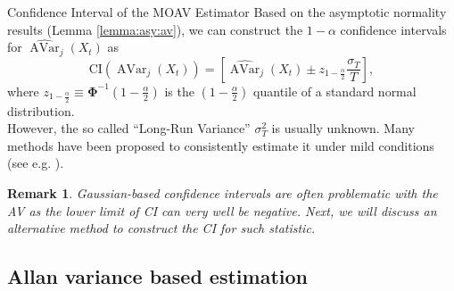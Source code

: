 \documentclass[envcountsect,usenames,dvipsnames]{beamer}
\DeclareMathOperator{\AV}{AVar}
\theoremstyle{mystyle}
\newtheorem{Remark}{Remark}
\begin{document}
\begin{frame}{Confidence Interval of the MOAV Estimator}
Based on the asymptotic normality results (Lemma \ref{lemma:asy:av}), we can construct the $1-\alpha$ confidence intervals for $\widehat{\AV}_j \left(X_t \right)$ as
%
\begin{equation*}
    \text{CI}\left(\AV_j \left(X_t \right)\right) = \left[ \widehat{\AV}_j \left(X_t \right) \pm z_{1 - \frac{\alpha}{2}} \frac{\sigma_{T}}{T} \right],
\end{equation*}
%
where $z_{1 - \frac{\alpha}{2}} \equiv \bm{\Phi}^{-1}\left( 1- \frac{\alpha}{2} \right)$ is the $(1- \frac{\alpha}{2})$ quantile of a standard normal distribution.\\
However, the so called ``Long-Run Variance'' $\sigma^2_{T}$ is usually unknown. Many methods have been proposed to consistently estimate it under mild conditions (see e.g.  \cite{newey1986simple}).

\begin{Remark}
Gaussian-based confidence intervals are often problematic with the AV as the lower limit of CI can very well be negative. Next, we will discuss an alternative method to construct the CI for such statistic.
\end{Remark}
\end{frame}

\subsection{Allan variance based estimation}
\end{document}

